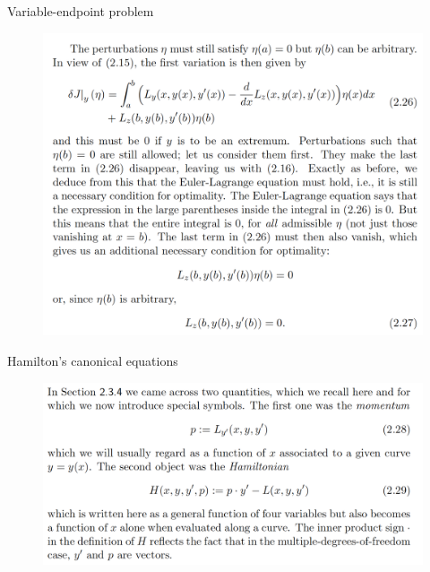\documentclass{beamer}
\begin{document}
\begin{frame}{Variable-endpoint problem}
    \begin{figure}
        \centering
        \includegraphics[width=\linewidth]{ch2/fig18.png}
    \end{figure}
\end{frame}


\begin{frame}{Hamilton's canonical equations}
    \begin{figure}
        \centering
        \includegraphics[width=\linewidth]{ch2/fig19.png}
    \end{figure}
\end{frame}
\end{document}
